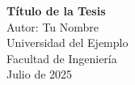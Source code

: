 
\begin{titlepage}
\centering
{\Large \textbf{Título de la Tesis}}\\[1cm]
Autor: Tu Nombre\\
Universidad del Ejemplo\\
Facultad de Ingeniería\\
Julio de 2025
\end{titlepage}
